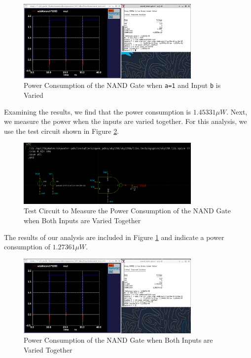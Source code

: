 \documentclass[fleqn]{article}
\begin{document}
	\begin{figure}[H]
		\centerline{\includegraphics[width=0.8\textwidth]{nand_power_sweep_vb.png}}
		\caption{Power Consumption of the NAND Gate when \texttt{a=1} and Input \texttt{b} is Varied}
		\label{fig::nand_power_sweep_vb}
	\end{figure}
	
	Examining the results, we find that the power consumption is $1.45331{\mu}W$. Next, we measure the power when the inputs are varied together. For this analysis, we use the test circuit shown in Figure \ref{fig::nand_power_test_sweep_va_vb}.
	
	\begin{figure}[H]
		\centerline{\includegraphics[width=0.8\textwidth]{nand_power_test_sweep_vb.png}}
		\caption{Test Circuit to Measure the Power Consumption of the NAND Gate when Both Inputs are Varied Together}
		\label{fig::nand_power_test_sweep_va_vb}
	\end{figure}
	
	The results of our analysis are included in Figure \ref{fig::nand_power_sweep_vb} and indicate a power consumption of $1.27361{\mu}W$. 
	
	\begin{figure}[H]
		\centerline{\includegraphics[width=0.8\textwidth]{nand_power_sweep_va_vb.png}}
		\caption{Power Consumption of the NAND Gate when Both Inputs are Varied Together}
		\label{fig::nand_power_sweep_va_vb}
	\end{figure}
	
\end{document}
